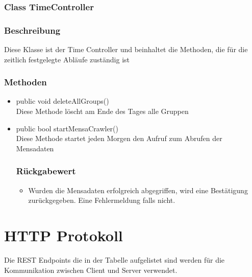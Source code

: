 \documentclass[a4paper]{scrreprt}
\begin{document}
\subsubsection{Class TimeController}
\subsubsection*{Beschreibung}
Diese Klasse ist der Time Controller und beinhaltet die Methoden, die für die zeitlich festgelegte Abläufe zuständig ist

\subsubsection*{Methoden}
\begin{addmargin}[25pt]{0pt}
\begin{itemize}

\item public void deleteAllGroups()\\
	Diese Methode löscht am Ende des Tages alle Gruppen
	
\item public bool startMensaCrawler()\\
	Diese Methode startet jeden Morgen den Aufruf zum Abrufen der Mensadaten
	\subsubsection*{Rückgabewert}
	\begin{itemize}
	\item Wurden die Mensadaten erfolgreich abgegriffen, wird eine Bestätigung zurückgegeben. Eine Fehlermeldung falls nicht.
	\end{itemize}

\end{itemize}
\end{addmargin}


\section{HTTP Protokoll}

Die REST Endpoints die in der Tabelle aufgelistet sind werden für die Kommunikation zwischen Client und Server verwendet. \\
\end{document}
